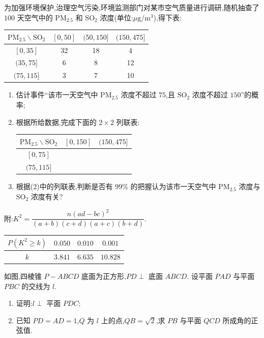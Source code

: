 \begin{problem}
为加强环境保护,治理空气污染,环境监测部门对某市空气质量进行调研,随机抽查了 \(100\) 天空气中的 \(\mathrm{PM}_{2.5}\) 和 \(\mathrm{SO}_2\) 浓度(单位:\(\mu\text{g}/\text{m}^3\)),得下表:

\begin{center}
\begin{tabular}{c|ccc}
\(\mathrm{PM}_{2.5}\backslash\mathrm{SO}_2\) & \([0,50]\) & \((50,150]\) & \((150,475]\) \\
\hline
\([0,35]\) & 32 & 18 & 4 \\
\((35,75]\) & 6 & 8 & 12 \\
\((75,115]\) & 3 & 7 & 10 \\
\end{tabular}
\end{center}

\begin{enumerate}
\item 估计事件``该市一天空气中 \(\mathrm{PM}_{2.5}\) 浓度不超过 \(75\),且 \(\mathrm{SO}_2\) 浓度不超过 \(150\)''的概率;
\item 根据所给数据,完成下面的 \(2\times2\) 列联表:

\begin{center}
\begin{tabular}{c|cc}
\(\mathrm{PM}_{2.5}\backslash\mathrm{SO}_2\) & \([0,150]\) & \((150,475]\) \\
\hline
\([0,75]\) & & \\
\((75,115]\) & & \\
\end{tabular}
\end{center}

\item 根据(2)中的列联表,判断是否有 \(99\%\) 的把握认为该市一天空气中 \(\mathrm{PM}_{2.5}\) 浓度与 \(\mathrm{SO}_2\) 浓度有关?
\end{enumerate}

附:\(K^2=\dfrac{n(ad-bc)^2}{(a+b)(c+d)(a+c)(b+d)}\).

\begin{center}
\begin{tabular}{c|ccc}
\(P(K^2\geqslant k)\) & \(0.050\) & \(0.010\) & \(0.001\) \\
\hline
\(k\) & \(3.841\) & \(6.635\) & \(10.828\)
\end{tabular}
\end{center}
\end{problem}

\begin{problem}
如图,四棱锥 \(P-ABCD\) 底面为正方形,\(PD\perp\) 底面 \(ABCD\). 设平面 \(PAD\) 与平面 \(PBC\) 的交线为 \(l\).

\begin{enumerate}
\item 证明:\(l\perp\) 平面 \(PDC\);
\item 已知 \(PD=AD=1\),\(Q\) 为 \(l\) 上的点,\(QB=\sqrt2\),求 \(PB\) 与平面 \(QCD\) 所成角的正弦值.
\end{enumerate}

\end{problem}

